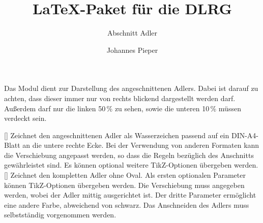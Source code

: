 \documentclass[
    a4paper,
    12pt,
    parskip=half,
]{scrartcl}
\title{\LaTeX{}-Paket für die DLRG}
\subtitle{Abschnitt Adler}
\author{Johannes Pieper}
\begin{document}
    Das Modul  dient zur Darstellung des angeschnittenen Adlers. Dabei ist darauf zu achten, dass dieser immer nur von rechts blickend dargestellt werden darf. Außerdem darf nur die linken 50\,\% zu sehen, sowie die unteren 10\,\% müssen verdeckt sein.

    \begin{commands}
        [] Zeichnet den angeschnittenen Adler als Wasserzeichen passend auf ein DIN-A4-Blatt an die untere rechte Ecke. Bei der Verwendung von anderen Formaten kann die Verschiebung angepasst werden, so dass die Regeln bezüglich des Anschnitts gewährleistet sind. Es können optional weitere TikZ-Optionen übergeben werden.
        [] Zeichnet den kompletten Adler ohne Oval. Als ersten optionalen Parameter können TikZ-Optionen übergeben werden. Die Verschiebung muss angegeben werden, wobei der Adler mittig ausgerichtet ist. Der dritte Parameter ermöglicht eine andere Farbe, abweichend von schwarz. Das Anschneiden des Adlers muss selbstständig vorgenommen werden.
        \begin{example}[gobble=12]
        \end{example}
    \end{commands}
\end{document}
